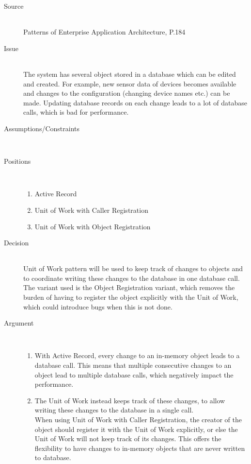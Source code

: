 \begin{description}
\item [Source]~\\
Patterns of Enterprise Application Architecture, P.184 \cite{Fowler:2002:PEA:579257}

\item [Issue]~\\
The system has several object stored in a database which can be edited and created. For example, new sensor data of devices becomes available and changes to the configuration (changing device names etc.) can be made. Updating database records on each change leads to a lot of database calls, which is bad for performance.

\item [Assumptions/Constraints]~\\

\item [Positions]~
\begin{enumerate}
\item Active Record
\item Unit of Work with Caller Registration
\item Unit of Work with Object Registration
\end{enumerate}

\item [Decision] ~\\
Unit of Work pattern will be used to keep track of changes to objects and to coordinate writing these changes to the database in one database call.
The variant used is the Object Registration variant, which removes the burden of having to register the object explicitly with the Unit of Work, which could introduce bugs when this is not done.

\item [Argument]~\\
\begin{enumerate}
\item With Active Record, every change to an in-memory object leads to a database call. This means that multiple consecutive changes to an object lead to multiple database calls, which negatively impact the performance.

\item The Unit of Work instead keeps track of these changes, to allow writing these changes to the database in a single call.\\ When using Unit of Work with Caller Registration, the creator of the object should register it with the Unit of Work explicitly, or else the Unit of Work will not keep track of its changes. This offers the flexibility to have changes to in-memory objects that are never written to database. 


\end{enumerate}
\end{description}
